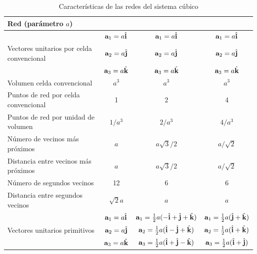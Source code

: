 \begin{table}[h!] \centering
	\begin{tabular}{lccc}
		Red (parámetro $a$) & \sc & \bcc & \fcc \\ \hline 
		& $\mathbf{a}_1=a\hat{\mathbf{i}}$ &  $\mathbf{a}_1=a\hat{\mathbf{i}}$ & $\mathbf{a}_1=a\hat{\mathbf{i}}$  \\		
		Vectores unitarios por celda convencional  & $\mathbf{a}_2=a\hat{\mathbf{j}}$  & $\mathbf{a}_2=a\hat{\mathbf{j}}$  &  $\mathbf{a}_2=a\hat{\mathbf{j}}$ \\
		& $\mathbf{a}_3=a\hat{\mathbf{k}}$ & $\mathbf{a}_3=a\hat{\mathbf{k}}$  & $\mathbf{a}_3=a\hat{\mathbf{k}}$ \\ \hline
		Volumen celda convencional & $a^3$ & $a^3$ & $a^3$ \\ \hline
		Puntos de red por celda convencional & 1 & 2 & 4 \\ \hline
		Puntos de red por unidad de volumen & $1/a^3$ &  $2/a^3$ &  $4/a^3$ \\ \hline
		Número de vecinos más próximos & $a$ & $a\sqrt{3}/2$ & $a/\sqrt{2}$ \\ \hline
		Distancia entre vecinos más próximos & $a$ & $a\sqrt{3}/2$ & $a/\sqrt{2}$ \\ \hline
		Número de segundos vecinos & 12 & 6 & 6 \\ \hline
		Distancia entre segundos vecinos & $\sqrt{2} a$ & $a$ & $a$ \\ \hline
		& $\mathbf{a}_1=a\hat{\mathbf{i}}$ &  $\mathbf{a}_1=\frac{1}{2} a (-\hat{\mathbf{i}}+\hat{\mathbf{j}}+\hat{\mathbf{k}})$ &   $\mathbf{a}_1=\frac{1}{2} a (\hat{\mathbf{j}}+\hat{\mathbf{k}})$  \\
		Vectores unitarios primitivos &$\mathbf{a}_2=a\hat{\mathbf{j}}$ &  $\mathbf{a}_2=\frac{1}{2} a (\hat{\mathbf{i}}-\hat{\mathbf{j}}+\hat{\mathbf{k}})$ &   $\mathbf{a}_2=\frac{1}{2} a (\hat{\mathbf{i}}+\hat{\mathbf{k}})$  \\
		&$\mathbf{a}_3=a\hat{\mathbf{k}}$ &  $\mathbf{a}_3=\frac{1}{2} a (\hat{\mathbf{i}}+\hat{\mathbf{j}}-\hat{\mathbf{k}})$ &   $\mathbf{a}_3=\frac{1}{2} a (\hat{\mathbf{i}}+\hat{\mathbf{j}})$  \\ \hline		
	\end{tabular}
	\caption{Características de las redes del sistema cúbico}
	\label{Tab:01-03}
\end{table} 

